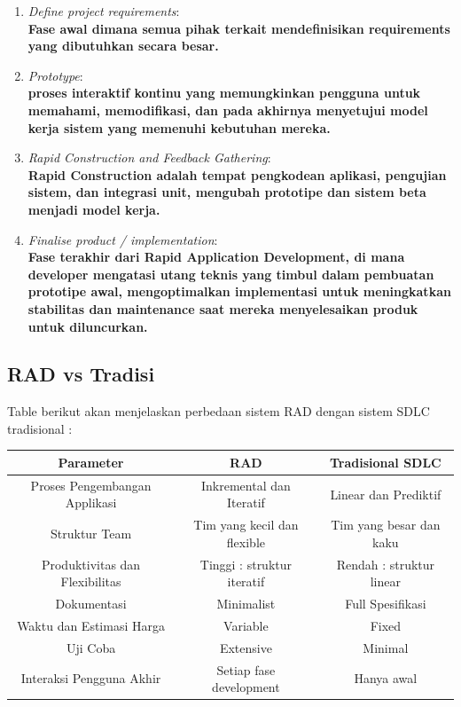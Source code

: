 \begin{enumerate}
    \item \emph{Define project requirements}:\\
    \textbf{Fase awal dimana semua pihak terkait mendefinisikan requirements yang dibutuhkan secara besar.}

    \item \emph{Prototype}:\\
    \textbf{proses interaktif kontinu yang memungkinkan pengguna untuk memahami, memodifikasi, dan pada akhirnya menyetujui model kerja sistem yang memenuhi kebutuhan mereka.}

    \item \emph{Rapid Construction and Feedback Gathering}:\\
    \textbf{Rapid Construction adalah tempat pengkodean aplikasi, pengujian sistem, dan integrasi unit, mengubah prototipe dan sistem beta menjadi model kerja.}

    \item \emph{Finalise product / implementation}:\\
    \textbf{Fase terakhir dari Rapid Application Development, di mana developer mengatasi utang teknis yang timbul dalam pembuatan prototipe awal, mengoptimalkan implementasi untuk meningkatkan stabilitas dan maintenance saat mereka menyelesaikan produk untuk diluncurkan.}
\end{enumerate}

\subsection{RAD vs Tradisi}
Table berikut akan menjelaskan perbedaan sistem RAD dengan sistem SDLC tradisional\cite{wavemaker} :

\newpage

\begin{center}
    \begin{tabular}{||c c c ||} 
     \hline
     Parameter & RAD & Tradisional SDLC \\ [0.5ex] 
     \hline\hline
     Proses Pengembangan Applikasi & Inkremental dan Iteratif & Linear dan Prediktif\\ 
     \hline
     Struktur Team & Tim yang kecil dan flexible & Tim yang besar dan kaku \\
     \hline
     Produktivitas dan Flexibilitas & Tinggi : struktur iteratif & Rendah : struktur linear\\
     \hline
     Dokumentasi & Minimalist & Full Spesifikasi \\
     \hline
     Waktu dan Estimasi Harga & Variable & Fixed \\
     \hline
     Uji Coba & Extensive & Minimal \\
     \hline
     Interaksi Pengguna Akhir & Setiap fase development & Hanya awal\\
     \hline
    \end{tabular}
\end{center}    

